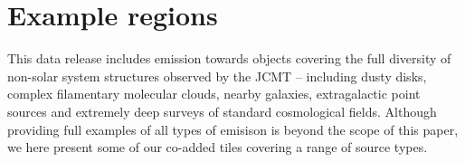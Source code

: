 \documentclass[twocolumn,times]{aastex6}
\begin{document}
\section{Example regions}
This data release includes emission towards objects covering the full
diversity of non-solar system structures observed by the JCMT --
including dusty disks, complex filamentary molecular clouds, nearby
galaxies, extragalactic point sources and extremely deep surveys of
standard cosmological fields. Although providing full examples of all
types of emisison is beyond the scope of this paper, we here present
some of our co-added tiles covering a range of source types.
\end{document}
